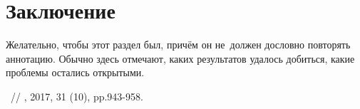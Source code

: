 \documentclass[12pt,twoside]{article}
\begin{document}
\section{Заключение}
Желательно, чтобы этот раздел был, причём он не~должен дословно повторять аннотацию.
Обычно здесь отмечают,
каких результатов удалось добиться,
какие проблемы остались открытыми.




\begin{thebibliography}{1}

	~//
	, 2017, 31 (10), pp.943-958.
    
\end{thebibliography}

\end{document}
